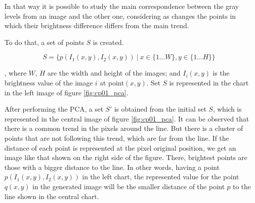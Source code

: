 In that way it is possible to study the main correspondence between the gray levels from an image and the other one, considering as changes the points in which their brightness difference differs from the main trend.

To do that, a set of points $S$ is created.

\begin{equation}\label{eq:cp01_brightness_relation}
S = \{ p(I_1(x, y), I_2(x,y)) ~|~ x \in \{1 \dots W\}, y \in \{1 \dots H\} \}
\end{equation}

, where $W$, $H$ are the width and height of the images; and $I_i(x, y)$ is the brightness value of the image $i$ at point$(x,y)$. Set $S$ is represented in the chart in the left image of figure \ref{fig:cp01_pca}.

After performing the \ac{PCA}, a set $S'$ is obtained from the initial set $S$, which is represented in the central image of figure \ref{fig:cp01_pca}. It can be observed that there is a common trend in the pixels around the line. But there is a cluster of points that are not following this trend, which are far from the line. If the distance of each point is represented at the pixel original position, we get an image like that shown on the right side of the figure. There, brightest points are those with a bigger distance to the line. In other words, having a point $p(I_1(x, y), I_2(x, y))$ in the left chart, the represented value for the point $q(x, y)$ in the generated image will be the smaller distance of the point $p$ to the line shown in the central chart.

